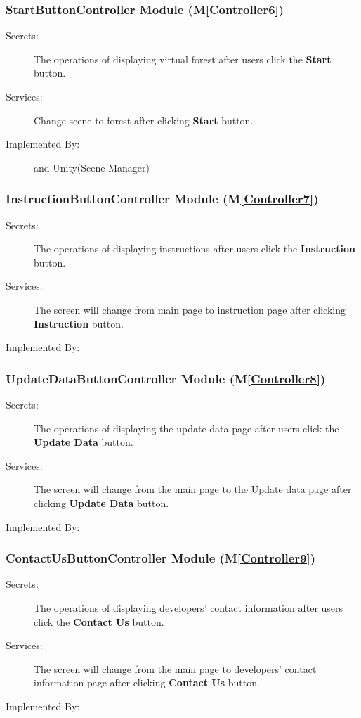 \documentclass[12pt, titlepage]{article}
\newcommand{\mref}[1]{M\ref{#1}}
\begin{document}
\renewcommand{\bt}{\textbf{Start }}
\subsubsection{StartButtonController Module (\mref{Controller6})}
\begin{description}
\item[Secrets:] The operations of displaying virtual
forest after users click the \bt button.
\item[Services:] Change scene to forest after clicking \bt button.
\item[Implemented By:] \progname{} and Unity(Scene Manager)
\end{description}

\renewcommand{\bt}{\textbf{Instruction }}
\subsubsection{InstructionButtonController Module (\mref{Controller7})}
\begin{description}
\item[Secrets:] The operations of displaying instructions after users click the \bt button.
\item[Services:] The screen will change from main page to instruction page after clicking
 \bt button.
\item[Implemented By:] \progname{}
\end{description}

\renewcommand{\bt}{\textbf{Update Data }}
\subsubsection{UpdateDataButtonController Module (\mref{Controller8})}
\begin{description}
\item[Secrets:] The operations of displaying the update data page after users click the \bt
 button.
\item[Services:] The screen will change from the main page to the Update data page after clicking
 \bt button.
\item[Implemented By:] \progname{}
\end{description}

\renewcommand{\bt}{\textbf{Contact Us }}
\subsubsection{ContactUsButtonController Module (\mref{Controller9})}
\begin{description}
\item[Secrets:] The operations of displaying developers' contact information
 after users click the \bt button.
\item[Services:] The screen will change from the main page to developers' contact information page
 after clicking \bt button.
\item[Implemented By:] \progname{}
\end{description}
\end{document}
